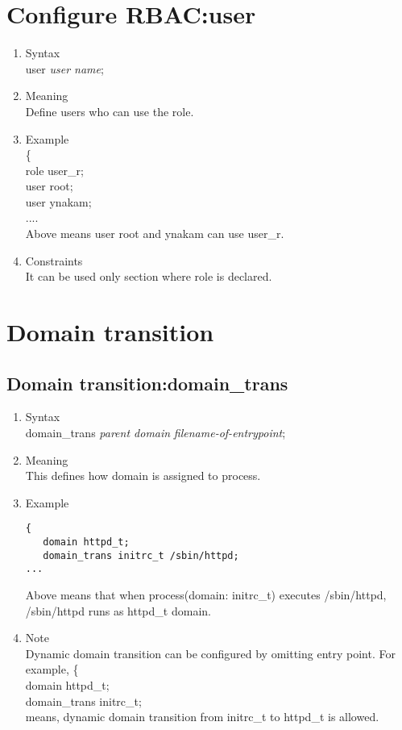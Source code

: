 \documentclass{article}
\begin{document}
\section{Configure RBAC:user}
\begin{enumerate}
 \item Syntax\\
       user {\it user name};
 \item Meaning\\
       Define users who can use the role. 
 \item Example\\
       \{\\
       role user\_r;\\
       user root;\\
       user ynakam;\\
       ....\\
Above means user root and ynakam can use user\_r.
\item Constraints\\
       It can be used only section where role is declared. 

\end{enumerate}

\section{Domain transition}
\subsection{Domain transition:domain\_trans}
\begin{enumerate}
 \item Syntax\\
    domain\_trans {\it parent domain} {\it filename-of-entrypoint};
 \item Meaning\\
    This defines how domain is assigned to process. 
 \item Example\\
\begin{verbatim}
{
   domain httpd_t;
   domain_trans initrc_t /sbin/httpd;
...
\end{verbatim}
    Above means that when process(domain: initrc\_t) executes
       /sbin/httpd, /sbin/httpd runs as httpd\_t domain.
 \item Note\\
       Dynamic domain transition can be configured by omitting entry
       point. For example,  
       \{\\
       domain httpd\_t;\\
       domain\_trans  initrc\_t;\\
       
       means, dynamic domain transition from initrc\_t to httpd\_t is allowed.

\end{enumerate}
\end{document}
